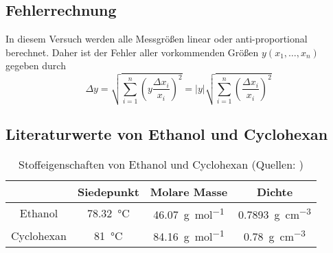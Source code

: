 \label{anhang}

\subsection{Fehlerrechnung}
In diesem Versuch werden alle Messgrößen linear oder anti-proportional berechnet. Daher ist der Fehler aller vorkommenden Größen $ y(x_1, \dots, x_n) $ gegeben durch
\begin{equation}
	\Delta y = \sqrt{\sum_{i=1}^{n}\left(y\frac{\Delta x_i}{x_i}\right)^2} 
		= |y|\sqrt{\sum_{i=1}^{n}\left(\frac{\Delta x_i}{x_i}\right)^2}  \label{eq:err}
\end{equation}

\subsection{Literaturwerte von Ethanol und Cyclohexan}

\begin{table}[h]
\centering
\begin{tabular} {c|c|c|c}
	 & Siedepunkt & Molare Masse & Dichte \\\hline
	Ethanol & \SI{78,32}{\degreeCelsius} & \SI{46,07}{\g\per\mol} &  \SI{0,7893}{\g\per\cubic\centi\m} \\
	Cyclohexan & \SI{81}{\degreeCelsius} & \SI{84,16}{ \g\per\mol} & \SI{0,78}{\g\per\cubic\centi\m} 
\end{tabular}
\caption{Stoffeigenschaften von Ethanol und Cyclohexan (Quellen: \cite{wiki:cyclohexan,wiki:ethanol})}
\label{tab:propEthanolCyclo}
\end{table} 

